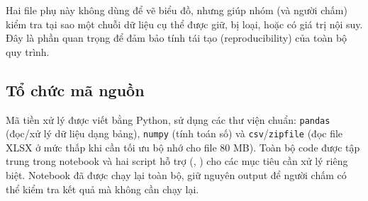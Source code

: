 Hai file phụ này không dùng để vẽ biểu đồ, nhưng giúp nhóm (và người chấm) kiểm tra tại sao một chuỗi dữ liệu cụ thể được giữ, bị loại, hoặc có giá trị nội suy. Đây là phần quan trọng để đảm bảo tính tái tạo (reproducibility) của toàn bộ quy trình.

\subsection{Tổ chức mã nguồn}

Mã tiền xử lý được viết bằng Python, sử dụng các thư viện chuẩn: \texttt{pandas} (đọc/xử lý dữ liệu dạng bảng), \texttt{numpy} (tính toán số) và \texttt{csv}/\texttt{zipfile} (đọc file XLSX ở mức thấp khi cần tối ưu bộ nhớ cho file 80 MB). Toàn bộ code được tập trung trong notebook  và hai script hỗ trợ (, ) cho các mục tiêu cần xử lý riêng biệt. Notebook đã được chạy lại toàn bộ, giữ nguyên output để người chấm có thể kiểm tra kết quả mà không cần chạy lại.
